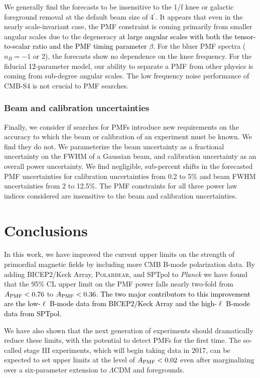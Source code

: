 \documentclass[apj]{emulateapj}
\newcommand{\apmf}{\ensuremath{A_{\rm PMF}}}
\newcommand{\lcdm}{\ensuremath{\Lambda}CDM}
\newcommand{\planck}{{\sl Planck}}
\newcommand{\bicepkeck}{BICEP2/Keck Array}
\newcommand{\pb}{\textsc{Polarbear}}
\newcommand{\sptpol}{SPTpol}
\newcommand{\changed}[1]{\textcolor{Black}{#1}}
\begin{document}
We generally find the forecasts to be insensitive to the 1/f knee or galactic foreground removal at the default beam size of 4$^\prime$. 
It appears that even in the nearly scale-invariant case, the PMF constraint is coming primarily from smaller angular scales due to the degeneracy \changed{at large angular scales with both the tensor-to-scalar ratio and the PMF timing parameter $\beta$}. 
For the bluer PMF spectra ($n_B=-1$ or 2), the forecasts show no dependence on the knee frequency. 
For the fiducial \changed{12}-parameter model, our ability to separate a PMF from other physics is coming from sub-degree angular scales. 
The low frequency noise performance of CMB-S4 is not crucial to PMF searches. 


\subsubsection{Beam and calibration uncertainties}
\label{subsec:beamcal}

Finally, we consider if searches for PMFs introduce new requirements on the accuracy to which the beam or  calibration of an experiment must be known. 
We find they do not. 
We parameterize the beam uncertainty as a fractional uncertainty on the FWHM of a Gaussian beam, and calibration uncertainty as an overall power uncertainty. 
We find negligible, sub-percent shifts in the forecasted PMF uncertainties for calibration uncertainties from 0.2 to 5\% and beam FWHM uncertainties from 2 to 12.5\%. 
The PMF constraints  for all three power law indices considered are insensitive to the beam and calibration uncertainties. 

\section{Conclusions}
\label{sec:conclusions}

In this work, we have improved the current upper limits on the strength of   primordial magnetic fields by including more CMB B-mode polarization data. 
By adding \bicepkeck{}, \pb, and \sptpol{} to \planck{} we have found that the 95\% CL upper limit on the PMF power falls nearly two-fold from $\apmf < \upperAplk$ to $\apmf < \upperAall$. 
\changed{The two major contributors to this improvement are the low-$\ell$ B-mode data from \bicepkeck{} and the high-$\ell$ B-mode data from \sptpol. }

We have also shown that the next generation of experiments should dramatically reduce these limits, with the potential to detect PMFs for the first time. 
The so-called stage III experiments, which will begin taking data in 2017, can be expected to set upper limits at the level of $\apmf < 0.02$ even after marginalizing over a six-parameter extension to \lcdm{} and foregrounds. 
\end{document}
